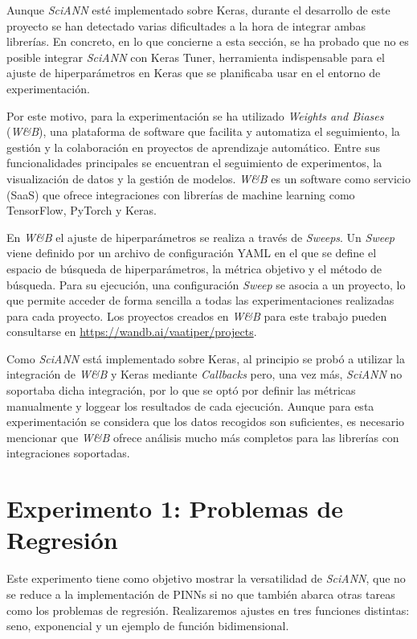 Aunque \textit{SciANN} esté implementado sobre Keras, durante el desarrollo de este proyecto se han detectado varias dificultades a la hora de integrar ambas librerías. En concreto, en lo que concierne a esta sección, se ha probado que no es posible integrar \textit{SciANN} con Keras Tuner, herramienta indispensable para el ajuste de hiperparámetros en Keras que se planificaba usar en el entorno de experimentación. 

Por este motivo, para la experimentación se ha utilizado \textit{Weights and Biases} (\textit{W\&B}), una plataforma de software que facilita y automatiza el seguimiento, la gestión y la colaboración en proyectos de aprendizaje automático. Entre sus funcionalidades principales se encuentran el seguimiento de experimentos, la visualización de datos y la gestión de modelos. \textit{W\&B} es un software como servicio (SaaS) que ofrece integraciones con librerías de machine learning como TensorFlow, PyTorch y Keras.

En \textit{W\&B} el ajuste de hiperparámetros se realiza a través de \textit{Sweeps}. Un \textit{Sweep} viene definido por un archivo de configuración YAML en el que se define el espacio de búsqueda de hiperparámetros, la métrica objetivo y el método de búsqueda. Para su ejecución, una configuración \textit{Sweep} se asocia a un proyecto, lo que permite acceder de forma sencilla a todas las experimentaciones realizadas para cada proyecto. Los proyectos creados en \textit{W\&B} para este trabajo pueden consultarse en \hyperlink{https://wandb.ai/vaatiper/projects}{https://wandb.ai/vaatiper/projects}. 

Como \textit{SciANN} está implementado sobre Keras, al principio se probó a utilizar la integración de \textit{W\&B} y Keras mediante \textit{Callbacks} pero, una vez más, \textit{SciANN} no soportaba dicha integración, por lo que se optó por definir las métricas manualmente y loggear los resultados de cada ejecución. Aunque para esta experimentación se considera que los datos recogidos son suficientes, es necesario mencionar que \textit{W\&B} ofrece análisis mucho más completos para las librerías con integraciones soportadas. 

\section{Experimento 1: Problemas de Regresión}\label{sec:8.2}

Este experimento tiene como objetivo mostrar la versatilidad de \textit{SciANN}, que no se reduce a la implementación de PINNs si no que también abarca otras tareas como los problemas de regresión. Realizaremos ajustes en tres funciones distintas: seno, exponencial y un ejemplo de función bidimensional.

